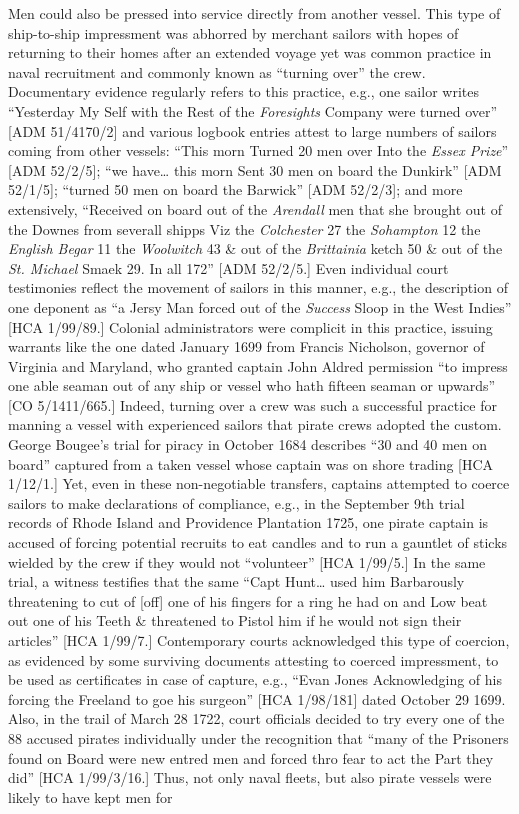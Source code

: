 \begin{styleStandard}
Men could also be pressed into service directly from another vessel. This type of ship-to-ship impressment was abhorred by merchant sailors with hopes of returning to their homes after an extended voyage yet was common practice in naval recruitment and commonly known as “turning over” the crew. Documentary evidence regularly refers to this practice, e.g., one sailor writes “Yesterday My Self with the Rest of the \textit{Foresights} Company were turned over” [ADM 51/4170/2] and various logbook entries attest to large numbers of sailors coming from other vessels: “This morn Turned 20 men over Into the \textit{Essex Prize}” [ADM 52/2/5]; “we have… this morn Sent 30 men on board the Dunkirk” [ADM 52/1/5]; “turned 50 men on board the Barwick” [ADM 52/2/3]; and more extensively, “Received on board out of the \textit{Arendall} men that she brought out of the Downes from severall shipps Viz the \textit{Colchester} 27 the \textit{Sohampton} 12 the \textit{English Begar} 11 the \textit{Woolwitch} 43 \& out of the \textit{Brittainia} ketch 50 \& out of the \textit{St. Michael} Smaek 29. In all 172” [ADM 52/2/5.] Even individual court testimonies reflect the movement of sailors in this manner, e.g., the description of one deponent as “a Jersy Man forced out of the \textit{Success} Sloop in the West Indies” [HCA 1/99/89.] Colonial administrators were complicit in this practice, issuing warrants like the one dated January 1699 from Francis Nicholson, governor of Virginia and Maryland, who granted captain John Aldred permission “to impress one able seaman out of any ship or vessel who hath fifteen seaman or upwards” [CO 5/1411/665.] Indeed, turning over a crew was such a successful practice for manning a vessel with experienced sailors that pirate crews adopted the custom. George Bougee’s trial for piracy in October 1684 describes “30 and 40 men on board” captured from a taken vessel whose captain was on shore trading [HCA 1/12/1.] Yet, even in these non-negotiable transfers, captains attempted to coerce sailors to make declarations of compliance, e.g., in the September 9th trial records of Rhode Island and Providence Plantation 1725, one pirate captain is accused of forcing potential recruits to eat candles and to run a gauntlet of sticks wielded by the crew if they would not “volunteer” [HCA 1/99/5.] In the same trial, a witness testifies that the same “Capt Hunt… used him Barbarously threatening to cut of [off] one of his fingers for a ring he had on and Low beat out one of his Teeth \& threatened to Pistol him if he would not sign their articles” [HCA 1/99/7.] Contemporary courts acknowledged this type of coercion, as evidenced by some surviving documents attesting to coerced impressment, to be used as certificates in case of capture, e.g., “Evan Jones Acknowledging of his forcing the Freeland to goe his surgeon” [HCA 1/98/181] dated October 29 1699. Also, in the trail of March 28 1722, court officials decided to try every one of the 88 accused pirates individually under the recognition that “many of the Prisoners found on Board were new entred men and forced thro fear to act the Part they did” [HCA 1/99/3/16.] Thus, not only naval fleets, but also pirate vessels were likely to have kept men for 
\end{styleStandard}
